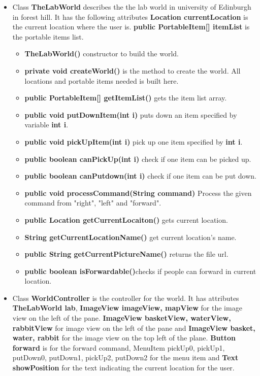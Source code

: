 \documentclass[11pt]{article}
\begin{document}
\begin{itemize}
	\item Class {\bf TheLabWorld} describes the the lab world in university of Edinburgh in forest hill. It has the following attributes {\bf Location currentLocation} is the current location where the user is. {\bf public PortableItem[] itemList} is the portable items list. 
	\begin{itemize}
	\item {\bf TheLabWorld()} constructor to build the world.
	\item {\bf private void createWorld()} is the method to create the world. All locations and portable items needed is built here.
	\item {\bf public PortableItem[] getItemList()} gets the item list array.
	\item {\bf public void putDownItem(int i)} puts down an item specified by variable {\bf int i}.
	\item {\bf public void pickUpItem(int i)} pick up one item specified by {\bf int i}.
	\item {\bf public boolean canPickUp(int i)} check if one item can be picked up. 
	\item {\bf public boolean canPutdown(int i)} check if one item can be put down.
	\item {\bf public void processCommand(String command)} Process the given command from "right", "left" and "forward".
	\item {\bf public Location getCurrentLocaiton()} gets current location.
	\item {\bf String getCurrentLocationName()} get current location's name.
	\item {\bf     public String getCurrentPictureName()} returns the file url.
	\item {\bf    public boolean isForwardable()}checks if people can forward in current location.
	\end{itemize}
	\item  Class {\bf WorldController} is the controller for the world. It has attributes {\bf TheLabWorld lab}, {\bf ImageView imageView, mapView} for the image view on the left of the pane. {\bf ImageView basketView, waterView, rabbitView} for image view on the left of the pane and {\bf ImageView basket, water, rabbit } for the image view on the top left of the plane. {\bf Button forward} is for the forward command, {MenuItem pickUp0, pickUp1, putDown0, putDown1, pickUp2, putDown2} for the menu item and {\bf Text showPosition} for the text indicating the current location for the user.


\end{itemize}
\end{document}
